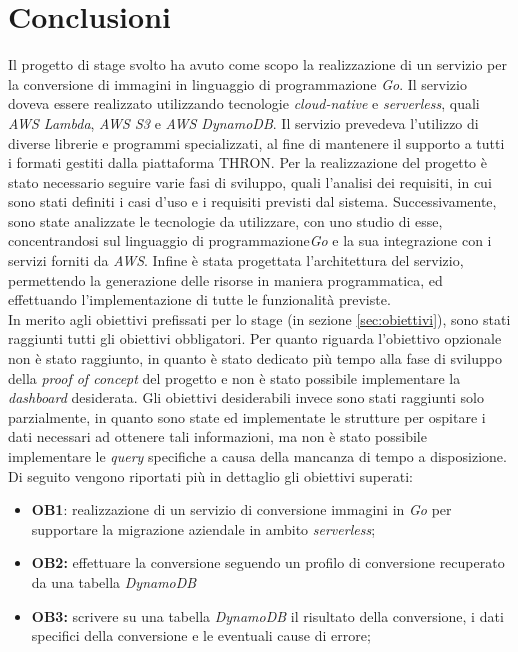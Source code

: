 \chapter{Conclusioni}
\label{cap:conclusioni}

Il progetto di stage svolto ha avuto come scopo la realizzazione di un servizio
per la conversione di immagini in linguaggio di programmazione \emph{Go}. Il
servizio doveva essere realizzato utilizzando tecnologie \emph{cloud-native} e
\emph{serverless}, quali \emph{AWS Lambda}, \emph{AWS S3} e \emph{AWS DynamoDB}.
Il servizio prevedeva l'utilizzo di diverse librerie e programmi specializzati,
al fine di mantenere il supporto a tutti i formati gestiti dalla piattaforma
THRON. Per la realizzazione del progetto è stato necessario seguire varie fasi
di sviluppo, quali l'analisi dei requisiti, in cui sono stati definiti i casi
d'uso e i requisiti previsti dal sistema. Successivamente, sono state analizzate
le tecnologie da utilizzare, con uno studio di esse, concentrandosi sul
linguaggio di programmazione\emph{Go} e la sua integrazione con i servizi
forniti da \emph{AWS}. Infine è stata progettata l'architettura del servizio,
permettendo la generazione delle risorse in maniera programmatica, ed
effettuando l'implementazione di tutte le funzionalità previste.\\

In merito agli obiettivi prefissati per lo stage (in sezione
\ref{sec:obiettivi}), sono stati raggiunti tutti gli obiettivi obbligatori. Per
quanto riguarda l'obiettivo opzionale non è stato raggiunto, in quanto è stato
dedicato più tempo alla fase di sviluppo della \emph{proof of concept} del
progetto e non è stato possibile implementare la \emph{dashboard} desiderata.
Gli obiettivi desiderabili invece sono stati raggiunti solo parzialmente, in
quanto sono state ed implementate le strutture per ospitare i dati necessari ad
ottenere tali informazioni, ma non è stato possibile implementare le
\emph{query} specifiche a causa della mancanza di tempo a disposizione.\\
Di seguito vengono riportati più in dettaglio gli obiettivi superati:
\begin{itemize}
    \item \textbf{OB1}: realizzazione di un servizio di conversione immagini
          in \emph{Go} per supportare la migrazione aziendale in ambito
          \emph{\glsfirstoccur\gls{serverless}};
    \item \textbf{OB2:} effettuare la conversione seguendo un profilo di
          conversione recuperato da una tabella \emph{\glsfirstoccur\gls{DynamoDB}}
    \item \textbf{OB3:} scrivere su una tabella \emph{DynamoDB} il risultato
          della conversione, i dati specifici della conversione e le eventuali cause
          di errore;
\end{itemize}

